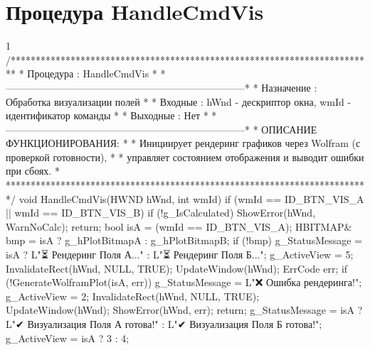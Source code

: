 \section{Процедура HandleCmdVis}
\footnotesize
\begin{listing}{1}
/*************************************************************************
* Процедура     : HandleCmdVis                                           *
*------------------------------------------------------------------------*
* Назначение    : Обработка визуализации полей                           *
* Входные       : hWnd - дескриптор окна, wmId - идентификатор команды   *
* Выходные      : Нет                                                    *
*------------------------------------------------------------------------*
* ОПИСАНИЕ ФУНКЦИОНИРОВАНИЯ:                                             *
* Инициирует рендеринг графиков через Wolfram (с проверкой готовности),  *
* управляет состоянием отображения и выводит ошибки при сбоях.           *
*************************************************************************/
void HandleCmdVis(HWND hWnd, int wmId) {
    if (wmId == ID_BTN_VIS_A || wmId == ID_BTN_VIS_B) {
        if (!g_IsCalculated) { ShowError(hWnd, WarnNoCalc); return; }
        bool isA = (wmId == ID_BTN_VIS_A); 
        HBITMAP& bmp = isA ? g_hPlotBitmapA : g_hPlotBitmapB;
        if (!bmp) { g_StatusMessage = isA ? L"⏳ Рендеринг Поля А..." : 
                                    L"⏳ Рендеринг Поля Б..."; g_ActiveView = 5; 
            InvalidateRect(hWnd, NULL, TRUE); UpdateWindow(hWnd); ErrCode err;
            if (!GenerateWolframPlot(isA, err)) {
                g_StatusMessage = L"❌ Ошибка рендеринга!"; g_ActiveView = 2;
                InvalidateRect(hWnd, NULL, TRUE); UpdateWindow(hWnd); ShowError(hWnd, err); 
                return;}
        }
        g_StatusMessage = isA ? L"✔ Визуализация Поля А готова!" : 
                                L"✔ Визуализация Поля Б готова!";
        g_ActiveView = isA ? 3 : 4;}
}
\end{listing}
\normalsize

\pagebreak

